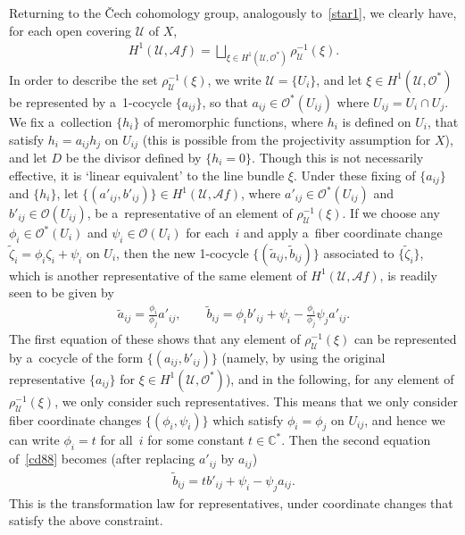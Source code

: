 \documentclass[11pt]{article}
\numberwithin{equation}{section}
\begin{document}
Returning to the \v Cech cohomology group, analogously to~\eqref{star1}, we clearly have, for each open covering
$\mathscr U$ of $X$,
\begin{gather*}%
H^1 (\mathscr U,\mathscr Af) = \bigsqcup_{\xi \in H^1(\mathscr U,\mathscr O^*)}\rho_{\mathscr U}^{-1}(\xi).
\end{gather*}
In order to describe the set $\rho_{\mathscr U}^{-1}(\xi)$, we write $\mathscr U = \{U_i\}$, and let $\xi\in
H^1(\mathscr U,\mathscr O^*)$ be represented by a~1-cocycle $\{a_{ij}\}$, so that $a_{ij}\in \mathscr O^*(U_{ij})$ where
$U_{ij}=U_i\cap U_j$.
We f\/ix a~collection $\{h_i\}$ of meromorphic functions, where $h_i$ is def\/ined on $U_i$, that satisfy $h_i = a_{ij}
h_j$ on $U_{ij}$ (this is possible from the projectivity assumption for $X$), and let $D$ be the divisor def\/ined by
$\{h_i = 0\}$.
Though this is not necessarily ef\/fective, it is `linear equivalent' to the line bundle $\xi$.
Under these f\/ixing of $\{a_{ij}\}$ and $\{h_i\}$, let $\{(a'_{ij},b'_{ij})\}\in H^1(\mathscr U,\mathscr Af)$, where
$a'_{ij}\in\mathscr O^*(U_{ij})$ and $b'_{ij}\in \mathscr O(U_{ij})$, be a~representative of an element of
$\rho_{\mathscr U}^{-1}(\xi)$.
If we choose any $\phi_i\in \mathscr O^*(U_i)$ and $\psi_i\in \mathscr O(U_i)$ for each~$i$ and apply a~f\/iber
coordinate change $\tilde{\zeta}_i= \phi_i\zeta_i + \psi_i$ on $U_i$, then the new 1-cocycle $\{(\tilde a_{ij},\tilde
b_{ij})\}$ associated to $\{\tilde{\zeta}_i\}$, which is another representative of the same element of $H^1(\mathscr
U,\mathscr Af)$, is readily seen to be given by
\begin{gather}
\label{cd88}
\tilde a_{ij} = \frac{\phi_i}{\phi_j}a'_{ij},
\qquad
\tilde b_{ij} = \phi_i b'_{ij} + \psi_i - \frac{\phi_i}{\phi_j}\psi_j a'_{ij}.
\end{gather}
The f\/irst equation of these shows that any element of $\rho_{\mathscr U}^{-1} (\xi)$ can be represented by a~cocycle
of the form $\{(a_{ij},b'_{ij})\}$ (namely, by using the original representative $\{a_{ij}\}$ for $\xi\in H^1(\mathscr
U,\mathscr O^*)$), and in the following, for any element of $\rho_{\mathscr U}^{-1} (\xi)$, we only consider such
representatives.
This means that we only consider f\/iber coordinate changes $\{(\phi_i,\psi_i)\}$ which satisfy $\phi_i = \phi_j$ on
$U_{ij}$, and hence we can write $\phi_i = t$ for all~$i$ for some constant $t\in \mathbb{C}^*$.
Then the second equation of~\eqref{cd88} becomes (after replacing $a'_{ij}$ by $a_{ij}$)
\begin{gather}
\label{cc89}
\tilde b_{ij} = t b'_{ij} + \psi_i -\psi_j a_{ij}.
\end{gather}
This is the transformation law for representatives, under coordinate changes that satisfy the above constraint.
\end{document}
